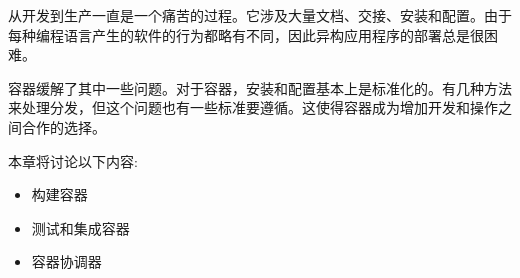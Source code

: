 
从开发到生产一直是一个痛苦的过程。它涉及大量文档、交接、安装和配置。由于每种编程语言产生的软件的行为都略有不同，因此异构应用程序的部署总是很困难。

容器缓解了其中一些问题。对于容器，安装和配置基本上是标准化的。有几种方法来处理分发，但这个问题也有一些标准要遵循。这使得容器成为增加开发和操作之间合作的选择。

本章将讨论以下内容:

\begin{itemize}
\item 
构建容器

\item 
测试和集成容器

\item 
容器协调器
\end{itemize}